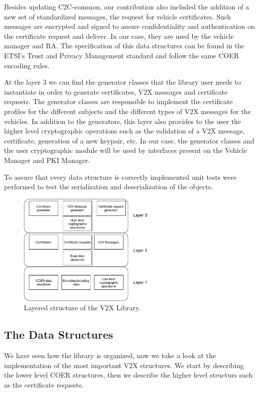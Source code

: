 Besides updating C2C-common, our contribution also included the addition of a new set of standardized messages, the request for vehicle certificates. Such messages are encrypted and signed to assure confidentiality and authentication on the certificate request and deliver. In our case, they are used by the vehicle manager and RA. The specification of this data structures can be found in the ETSI's Trust and Privacy Management standard \cite{etsi_privacy} and follow the same COER encoding rules. 

At the layer 3 we can find the generator classes that the library user needs to instantiate in order to generate certificates, V2X messages and certificate requests. The generator classes are responsible to implement the certificate profiles for the different subjects and the different types of V2X messages for the vehicles. In addition to the generators, this layer also provides to the user the higher level cryptographic operations such as the validation of a V2X message, certificate, generation of a new keypair, etc. In our case, the generator classes and the user cryptographic module will be used by interfaces present on the Vehicle Manager and PKI Manager. 

To assure that every data structure is correctly implemented unit tests were performed to test the serialization and deserialization of the objects.

\begin{figure}[!htb]
	\centering
	\includegraphics[width=0.6\textwidth]{Figures/v2xlib}
	\caption{\label{fig:v2x_arch} Layered structure of the V2X Library.}
\end{figure}

\subsection{The Data Structures}
We have seen how the library is organized, now we take a look at the implementation of the most important V2X structures. We start by describing the lower level COER structures, then we describe the higher level structurs such as the certificate requests.

